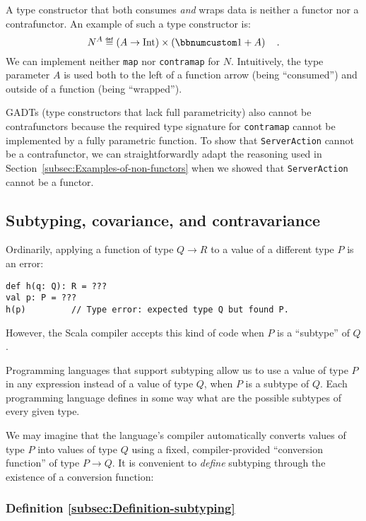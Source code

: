 A type constructor that both consumes \emph{and} wraps data is neither
a functor nor a contrafunctor. An example of such a type constructor
is:
\[
N^{A}\triangleq\left(A\rightarrow\text{Int}\right)\times\left(\bbnum 1+A\right)\quad.
\]
We can implement neither \lstinline!map! nor \lstinline!contramap!
for $N$. Intuitively, the type parameter $A$ is used both to the
left of a function arrow (being \textsf{``}consumed\textsf{''}) and outside of a function
(being \textsf{``}wrapped\textsf{''}).

GADTs (type constructors that lack full parametricity)
also cannot be contrafunctors because the required type signature
for \lstinline!contramap! cannot be implemented by a fully parametric
function. To show that \lstinline!ServerAction! cannot be a contrafunctor,
we can straightforwardly adapt the reasoning used in Section~\ref{subsec:Examples-of-non-functors}
when we showed that \lstinline!ServerAction! cannot be a functor.

\subsection{Subtyping, covariance, and contravariance\label{subsec:Covariance,-contravariance,-and-subtyping}}

Ordinarily, applying a function of type $Q\rightarrow R$ to a value
of a different type $P$ is an error:
\begin{lstlisting}
def h(q: Q): R = ???
val p: P = ???
h(p)         // Type error: expected type Q but found P.
\end{lstlisting}
However, the Scala compiler accepts this kind of code when $P$ is
a \textsf{``}subtype\textsf{''} of $Q$. 

Programming languages that support subtyping allow us to use a value
of type $P$ in any expression instead of a value of type $Q$, when
$P$ is a subtype of $Q$. Each programming language defines in some
way what are the possible subtypes of every given type. 

We may imagine that the language\textsf{'}s compiler automatically converts
values of type $P$ into values of type $Q$ using a fixed, compiler-provided
\textsf{``}conversion function\textsf{''} of type $P\rightarrow Q$. It is convenient
to \emph{define} subtyping through the existence of a conversion function:

\subsubsection{Definition \label{subsec:Definition-subtyping}\ref{subsec:Definition-subtyping} }

